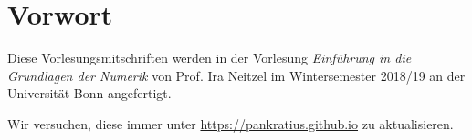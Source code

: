 \chapter*{Vorwort}
Diese Vorlesungsmitschriften werden in der Vorlesung \textit{Einführung in die Grundlagen der Numerik} von Prof. Ira Neitzel im Wintersemester 2018/19 an der Universität Bonn angefertigt.\par
Wir versuchen, diese immer unter \url{https://pankratius.github.io} zu aktualisieren.

